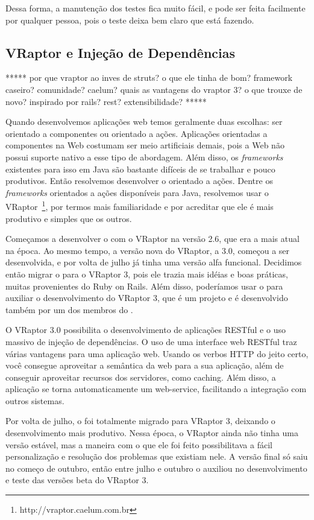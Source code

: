 Dessa forma, a manutenção dos testes fica muito fácil, e pode ser feita facilmente por qualquer pessoa, pois o 
teste deixa bem claro que está fazendo.


\subsection{VRaptor e Injeção de Dependências}

*****
por que vraptor ao inves de struts? o que ele tinha de bom? framework caseiro? comunidade? caelum?
quais as vantagens do vraptor 3? o que trouxe de novo? inspirado por rails? rest? extensibilidade?
*****

Quando desenvolvemos aplicações web temos geralmente duas escolhas: ser orientado a componentes ou orientado
a ações. Aplicações orientadas a componentes na Web costumam ser meio artificiais demais, pois a Web não
possui suporte nativo a esse tipo de abordagem. Além disso, os \textit{frameworks} existentes para isso em
Java são bastante difíceis de se trabalhar e pouco produtivos. Então resolvemos desenvolver o \calopsita orientado
a ações. Dentre os \textit{frameworks} orientados a ações disponíveis para Java, resolvemos usar o 
VRaptor~\footnote{http://vraptor.caelum.com.br}, por termos mais familiaridade e por acreditar que ele é mais 
produtivo e simples que os outros.

Começamos a desenvolver o \calopsita com o VRaptor na versão 2.6, que era a mais atual na época. 
Ao mesmo tempo, a versão nova do VRaptor, a 3.0, começou a ser desenvolvida, e por volta de julho já tinha 
uma versão alfa funcional. Decidimos então migrar o \calopsita para o VRaptor 3, pois ele trazia mais idéias
e boas práticas, muitas provenientes do Ruby on Rails. Além disso, poderíamos usar o \calopsita para auxiliar
o desenvolvimento do VRaptor 3, que é um projeto \opensource e é desenvolvido também por um dos membros do
\calopsita.

O VRaptor 3.0 possibilita o desenvolvimento de aplicações RESTful \cite{rest}
e o uso massivo de injeção de dependências\cite{di}. O uso de uma interface web RESTful traz várias vantagens para 
uma aplicação web. Usando os verbos HTTP do jeito certo, você consegue aproveitar a semântica da web para a 
sua aplicação, além de conseguir aproveitar recursos dos servidores, como caching. Além disso, a aplicação 
se torna automaticamente um web-service, facilitando a integração com outros sistemas.

Por volta de julho, o \calopsita foi totalmente migrado para VRaptor 3, deixando o desenvolvimento mais produtivo. 
Nessa época, o VRaptor ainda não tinha uma versão estável, mas a maneira com o que ele foi feito possibilitava a fácil
personalização e resolução dos problemas que existiam nele. A versão final só saiu no começo de outubro, então entre 
julho e outubro o \calopsita auxiliou no desenvolvimento e teste das versões beta do VRaptor 3.

